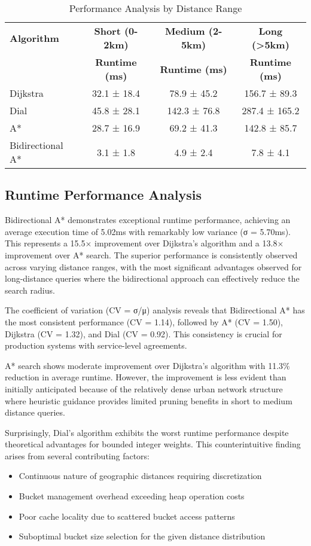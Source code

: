 \documentclass[conference]{IEEEtran}
\begin{document}
\begin{table}[htbp]
\caption{Performance Analysis by Distance Range}
\begin{center}
\begin{tabular}{|l|c|c|c|}
\hline
\textbf{Algorithm} & \textbf{Short (0-2km)} & \textbf{Medium (2-5km)} & \textbf{Long (>5km)} \\
& \textbf{Runtime (ms)} & \textbf{Runtime (ms)} & \textbf{Runtime (ms)} \\
\hline
Dijkstra & 32.1 ± 18.4 & 78.9 ± 45.2 & 156.7 ± 89.3 \\
\hline
Dial & 45.8 ± 28.1 & 142.3 ± 76.8 & 287.4 ± 165.2 \\
\hline
A* & 28.7 ± 16.9 & 69.2 ± 41.3 & 142.8 ± 85.7 \\
\hline
Bidirectional A* & 3.1 ± 1.8 & 4.9 ± 2.4 & 7.8 ± 4.1 \\
\hline
\end{tabular}
\end{center}
\label{tab:distance_analysis}
\end{table}

\subsection{Runtime Performance Analysis}

Bidirectional A* demonstrates exceptional runtime performance, achieving an average execution time of 5.02ms with remarkably low variance (σ = 5.70ms). This represents a 15.5× improvement over Dijkstra's algorithm and a 13.8× improvement over A* search. The superior performance is consistently observed across varying distance ranges, with the most significant advantages observed for long-distance queries where the bidirectional approach can effectively reduce the search radius.

The coefficient of variation (CV = σ/μ) analysis reveals that Bidirectional A* has the most consistent performance (CV = 1.14), followed by A* (CV = 1.50), Dijkstra (CV = 1.32), and Dial (CV = 0.92). This consistency is crucial for production systems with service-level agreements.

A* search shows moderate improvement over Dijkstra's algorithm with 11.3\% reduction in average runtime. However, the improvement is less evident than initially anticipated because of the relatively dense urban network structure where heuristic guidance provides limited pruning benefits in short to medium distance queries.

Surprisingly, Dial's algorithm exhibits the worst runtime performance despite theoretical advantages for bounded integer weights. This counterintuitive finding arises from several contributing factors:
\begin{itemize}
\item Continuous nature of geographic distances requiring discretization
\item Bucket management overhead exceeding heap operation costs
\item Poor cache locality due to scattered bucket access patterns
\item Suboptimal bucket size selection for the given distance distribution
\end{itemize}
\end{document}
